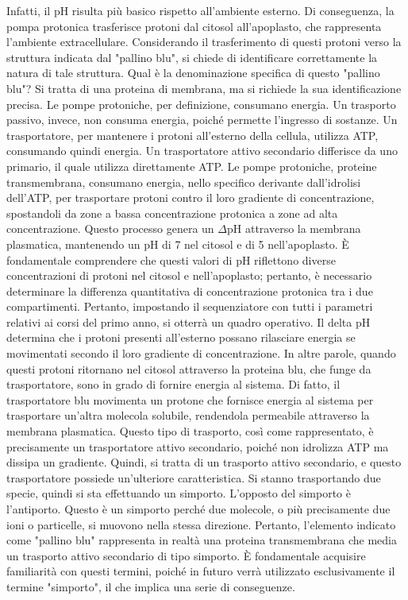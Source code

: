 \documentclass[11pt, a4paper]{article}
\begin{document}
\begin{spacing}{1}
Infatti, il pH risulta più basico rispetto all'ambiente esterno. Di conseguenza, la pompa protonica trasferisce protoni dal citosol all'apoplasto, che rappresenta l'ambiente extracellulare. Considerando il trasferimento di questi protoni verso la struttura indicata dal "pallino blu", si chiede di identificare correttamente la natura di tale struttura. Qual è la denominazione specifica di questo "pallino blu"? Si tratta di una proteina di membrana, ma si richiede la sua identificazione precisa.
Le pompe protoniche, per definizione, consumano energia. Un trasporto passivo, invece, non consuma energia, poiché permette l'ingresso di sostanze. Un trasportatore, per mantenere i protoni all'esterno della cellula, utilizza ATP, consumando quindi energia.
Un trasportatore attivo secondario differisce da uno primario, il quale utilizza direttamente ATP. Le pompe protoniche, proteine transmembrana, consumano energia, nello specifico derivante dall'idrolisi dell'ATP, per trasportare protoni contro il loro gradiente di concentrazione, spostandoli da zone a bassa concentrazione protonica a zone ad alta concentrazione. Questo processo genera un $\Delta$pH attraverso la membrana plasmatica, mantenendo un pH di 7 nel citosol e di 5 nell'apoplasto. È fondamentale comprendere che questi valori di pH riflettono diverse concentrazioni di protoni nel citosol e nell'apoplasto; pertanto, è necessario determinare la differenza quantitativa di concentrazione protonica tra i due compartimenti.
Pertanto, impostando il sequenziatore con tutti i parametri relativi ai corsi del primo anno, si otterrà un quadro operativo. Il delta pH determina che i protoni presenti all'esterno possano rilasciare energia se movimentati secondo il loro gradiente di concentrazione. In altre parole, quando questi protoni ritornano nel citosol attraverso la proteina blu, che funge da trasportatore, sono in grado di fornire energia al sistema. Di fatto, il trasportatore blu movimenta un protone che fornisce energia al sistema per trasportare un'altra molecola solubile, rendendola permeabile attraverso la membrana plasmatica. Questo tipo di trasporto, così come rappresentato, è precisamente un trasportatore attivo secondario, poiché non idrolizza ATP ma dissipa un gradiente. Quindi, si tratta di un trasporto attivo secondario, e questo trasportatore possiede un'ulteriore caratteristica.
Si stanno trasportando due specie, quindi si sta effettuando un simporto. L'opposto del simporto è l'antiporto. Questo è un simporto perché due molecole, o più precisamente due ioni o particelle, si muovono nella stessa direzione. Pertanto, l'elemento indicato come "pallino blu" rappresenta in realtà una proteina transmembrana che media un trasporto attivo secondario di tipo simporto. È fondamentale acquisire familiarità con questi termini, poiché in futuro verrà utilizzato esclusivamente il termine "simporto", il che implica una serie di conseguenze.

\end{spacing}
\end{document}
